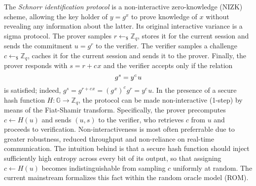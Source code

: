 \documentclass{iacrtrans}
\begin{document}
The \textit{Schnorr identification protocol}
is a non-interactive zero-knowledge (NIZK) scheme,
allowing the key holder of $y = g ^ x$
to prove knowledge of $x$
without revealing any information about the latter.
Its original interactive variance \cite{paper_schnorr} is a sigma protocol.
The prover samples $r \leftarrow_\$ \mathbb{Z}_q$,
stores it for the current session
and sends the commitment $u = g ^ r$ to the verifier.
The verifier samples a challenge $c \leftarrow_\$ \mathbb{Z}_q$,
caches it for the current session and sends it to the prover.
Finally, the prover responds with $s = r + c\hspace{1pt}x$
and the verifier accepts only if the relation
\vspace{5pt}
\begin{equation*}
g ^ s = y ^ c\hspace{1pt}u
\vspace{5pt}
\end{equation*}
is satisfied; indeed,
$g^s=g^{r + c\hspace{1pt}x}
=(g^{\hspace{1pt}x})^c\hspace{1pt}g^r
=y^c\hspace{1pt}u$.
In the presence of a secure hash function
$H: \mathbb{G} \rightarrow \mathbb{Z}_q$,
the protocol can be made non-interactive (1-step)
by means of the Fiat-Shamir transform. Specifically,
the prover precomputes $c \leftarrow H(u)$
and sends $(u, s)$ to the verifier,
who retrieves $c$ from $u$ and proceeds
to verification.
Non-interactiveness is most often preferrable
due to greater robustness, reduced throughput
and non-reliance on real-time communication.
The intuition behind is that a secure hash function
should inject sufficiently high entropy
across every bit of its output,
so that assigning $c \leftarrow H(u)$
becomes indistinguishable from sampling $c$ uniformly at random.
The current mainstream formalizes this fact
within the random oracle model (ROM).
\end{document}
